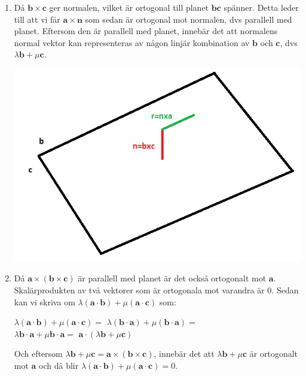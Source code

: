 \documentclass[a4paper]{report}
\begin{document}
\begin{enumerate}
\begin{enumerate}
            \item 
                Då $\bm{b}\times \bm{c}$ ger normalen, vilket är ortogonal till planet $\bm{bc}$ spänner. 
                Detta leder till att vi får $\bm{a}\times \bm{n}$ som sedan är ortogonal mot normalen, dvs parallell med planet.
                Eftersom den är parallell med planet, innebär det att normalens normal vektor kan representeras av någon linjär kombination av $\bm{b}$ och $\bm{c}$,
                dvs $\lambda\bm{b} + \mu\bm{c}$.
                \begin{center}
                    \includegraphics[scale=0.4]{bild2.png}
                \end{center}
            \item
                Då $\bm{a}\times (\bm{b}\times \bm{c})$ är parallell med planet är det också ortogonalt mot $\bm{a}$.
                Skalärprodukten av två vektorer som är ortogonala mot varandra är 0.
                Sedan kan vi skriva om $\lambda(\bm{a}\cdot\bm{b}) + \mu(\bm{a}\cdot\bm{c})$ som:
                \begin{center}
                    $\lambda(\bm{a}\cdot\bm{b}) + \mu(\bm{a}\cdot\bm{c})=$
                    $\lambda(\bm{b}\cdot\bm{a}) + \mu(\bm{b}\cdot\bm{a})=$\\
                    $\lambda\bm{b}\cdot\bm{a} + \mu\bm{b}\cdot\bm{a}=$
                    $\bm{a}\cdot(\lambda\bm{b} + \mu\bm{c})$
                \end{center}
                Och eftersom $\lambda\bm{b} + \mu\bm{c} = \bm{a}\times (\bm{b}\times \bm{c})$,
                innebär det att $\lambda\bm{b} + \mu\bm{c}$ är ortogonalt mot $\bm{a}$ och då blir $\lambda(\bm{a}\cdot\bm{b}) + \mu(\bm{a}\cdot\bm{c}) = 0$.


\end{enumerate}
\end{enumerate}
\end{document}

